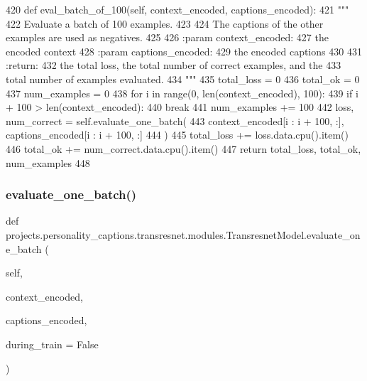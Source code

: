 \begin{DoxyCode}
420     \textcolor{keyword}{def }eval\_batch\_of\_100(self, context\_encoded, captions\_encoded):
421         \textcolor{stringliteral}{"""}
422 \textcolor{stringliteral}{        Evaluate a batch of 100 examples.}
423 \textcolor{stringliteral}{}
424 \textcolor{stringliteral}{        The captions of the other examples are used as negatives.}
425 \textcolor{stringliteral}{}
426 \textcolor{stringliteral}{        :param context\_encoded:}
427 \textcolor{stringliteral}{            the encoded context}
428 \textcolor{stringliteral}{        :param captions\_encoded:}
429 \textcolor{stringliteral}{            the encoded captions}
430 \textcolor{stringliteral}{}
431 \textcolor{stringliteral}{        :return:}
432 \textcolor{stringliteral}{            the total loss, the total number of correct examples, and the}
433 \textcolor{stringliteral}{            total number of examples evaluated.}
434 \textcolor{stringliteral}{        """}
435         total\_loss = 0
436         total\_ok = 0
437         num\_examples = 0
438         \textcolor{keywordflow}{for} i \textcolor{keywordflow}{in} range(0, len(context\_encoded), 100):
439             \textcolor{keywordflow}{if} i + 100 > len(context\_encoded):
440                 \textcolor{keywordflow}{break}
441             num\_examples += 100
442             loss, num\_correct = self.evaluate\_one\_batch(
443                 context\_encoded[i : i + 100, :], captions\_encoded[i : i + 100, :]
444             )
445             total\_loss += loss.data.cpu().item()
446             total\_ok += num\_correct.data.cpu().item()
447         \textcolor{keywordflow}{return} total\_loss, total\_ok, num\_examples
448 
\end{DoxyCode}
\mbox{\label{classprojects_1_1personality__captions_1_1transresnet_1_1modules_1_1TransresnetModel_aeabd7be189bc8127923aa8b424615110}} 
\subsubsection{\texorpdfstring{evaluate\+\_\+one\+\_\+batch()}{evaluate\_one\_batch()}}
{\footnotesize\ttfamily def projects.\+personality\+\_\+captions.\+transresnet.\+modules.\+Transresnet\+Model.\+evaluate\+\_\+one\+\_\+batch (\begin{DoxyParamCaption}\item[{}]{self,  }\item[{}]{context\+\_\+encoded,  }\item[{}]{captions\+\_\+encoded,  }\item[{}]{during\+\_\+train = {\ttfamily False} }\end{DoxyParamCaption})}

